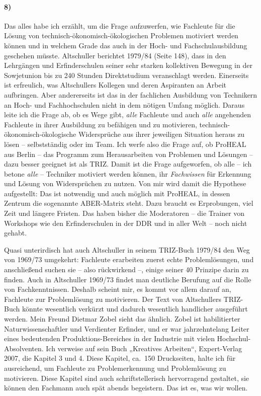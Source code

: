 \documentclass[12pt,a4paper]{article}
\begin{document}
\paragraph{8)} 
Das alles habe ich erzählt, um die Frage aufzuwerfen, wie Fachleute für die
Lösung von technisch-ökonomisch-ökologischen Problemen motiviert werden können
und in welchem Grade das auch in der Hoch- und Fachschulausbildung geschehen
müsste. Altschuller berichtet 1979/84 (Seite 148), dass in den Lehrgängen und
Erfinderschulen seiner sehr starken kollektiven Bewegung in der Sowjetunion bis
zu 240 Stunden Direktstudium veranschlagt werden. Einerseits ist erfreulich,
was Altschullers Kollegen und deren Aspiranten an Arbeit aufbringen. Aber
andererseits ist das in der fachlichen Ausbildung von Technikern an Hoch- und
Fachhochschulen nicht in dem nötigen Umfang möglich. Daraus leite ich die Frage
ab, ob es Wege gibt, \emph{alle} Fachleute und auch \emph{alle} angehenden
Fachleute in ihrer Ausbildung zu befähigen und zu motivieren,
technisch-ökonomisch-ökologische Widersprüche aus ihrer jeweiligen Situation
heraus zu lösen – selbstständig oder im Team. Ich werfe also die Frage auf, ob
ProHEAL aus Berlin – das Programm zum Herausarbeiten von Problemen und Lösungen
– dazu besser geeignet ist als TRIZ. Damit ist die Frage aufgeworfen, ob alle –
ich betone \emph{alle} – Techniker motiviert werden können, ihr
\emph{Fachwissen} für Erkennung und Lösung von Widersprüchen zu nutzen. Von mir
wird damit die Hypothese aufgestellt: Das ist notwendig und auch möglich mit
ProHEAL, in dessen Zentrum die sogenannte ABER-Matrix steht. Dazu braucht es
Erprobungen, viel Zeit und längere Fristen. Das haben bisher die Moderatoren –
die Trainer von Workshops wie den Erfinderschulen in der DDR und in aller Welt
– noch nicht gehabt. 

Quasi unterirdisch hat auch Altschuller in seinem TRIZ-Buch 1979/84 den Weg von
1969/73 umgekehrt: Fachleute erarbeiten zuerst echte Problemlösungen, und
anschließend suchen sie – also rückwirkend –, einige seiner 40 Prinzipe darin
zu finden. Auch in Altschuller 1969/73 findet man deutliche Berufung auf die
Rolle von Fachkenntnissen. Deshalb scheint mir, es kommt vor allem darauf an,
Fachleute zur Problemlösung zu motivieren. Der Text von Altschullers TRIZ-Buch
könnte wesentlich verkürzt und dadurch wesentlich handlicher ausgeführt werden.
Mein Freund Dietmar Zobel sieht das ähnlich. Zobel ist habilitierter
Naturwissenschaftler und Verdienter Erfinder, und er war jahrzehntelang Leiter
eines bedeutenden Produktions-Bereiches in der Industrie mit vielen
Hochschul-Absolventen. Ich verweise auf sein Buch „Kreatives Arbeiten“,
Expert-Verlag 2007, die Kapitel 3 und 4. Diese Kapitel, ca.\ 150 Druckseiten,
halte ich für ausreichend, um Fachleute zu Problemerkennung und Problemlösung
zu motivieren. Diese Kapitel sind auch schriftstellerisch hervorragend
gestaltet, sie können den Fachmann auch spät abends begeistern. Das ist es, was
wir wollen.
\end{document}
